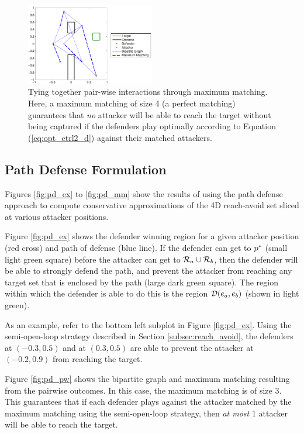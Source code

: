 \begin{figure}
	\centering
	\includegraphics[width=0.5\textwidth]{"fig/OLGame_mm_results_HJI"}
	\caption{Tying together pair-wise interactions through maximum matching. Here, a maximum matching of size 4 (a perfect matching) guarantees that \textit{no} attacker will be able to reach the target without being captured if the defenders play optimally according to Equation (\ref{eq:opt_ctrl2_d}) against their matched attackers.}
	\label{fig:OL_mm_HJI}
\end{figure}

\subsection{Path Defense Formulation}
Figures \ref{fig:pd_ex} to \ref{fig:pd_mm} show the results of using the path defense approach to compute conservative approximations of the 4D reach-avoid set sliced at various attacker positions.

Figure \ref{fig:pd_ex} shows the defender winning region for a given attacker position (red cross) and path of defense (blue line). If the defender can get to $p^*$ (small light green square) before the attacker can get to $\mathcal{R}_a \cup \mathcal{R}_b$, then the defender will be able to strongly defend the path, and prevent the attacker from reaching any target set that is enclosed by the path (large dark green square). The region within which the defender is able to do this is the region $\mathcal{D}(e_a,e_b)$ (shown in light green). 

As an example, refer to the bottom left subplot in Figure \ref{fig:pd_ex}. Using the semi-open-loop strategy described in Section \ref{subsec:reach_avoid}, the defenders at $(-0.3, 0.5)$ and at $(0.3, 0.5)$ are able to prevent the attacker at $(-0.2, 0.9)$ from reaching the target.

Figure \ref{fig:pd_pw} shows the bipartite graph and maximum matching resulting from the pairwise outcomes. In this case, the maximum matching is of size 3. This guarantees that if each defender plays against the attacker matched by the maximum matching using the semi-open-loop strategy, then \textit{at most} 1 attacker will be able to reach the target.

